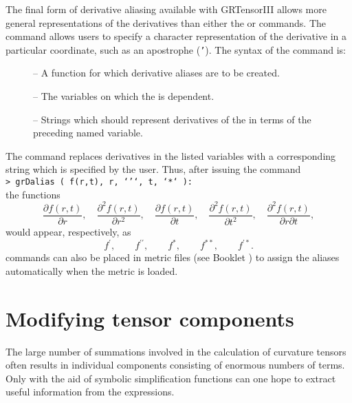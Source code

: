 \documentclass{article}
\begin{document}
{{{The final form of derivative aliasing available with GRTensorIII allows more
general representations of the derivatives than either the 
 or  commands. The 
command allows users to specify a character representation of the derivative
in a particular coordinate, such as an apostrophe (\texttt{'}). The syntax
of the command is:\\
%
\begin{cmdspec}
  \label{spec:grDalias}

  \begin{description}
    \item[] -- A function for which derivative aliases are
      to be created.
    \item[] -- The variables on which the 
      is dependent.
    \item[] -- Strings which should represent derivatives of
      the  in terms of the preceding named variable.
  \end{description}

\end{cmdspec}

The  command replaces derivatives in the listed variables
with a corresponding string which is specified by the user. Thus, after
issuing the command\\

\noindent\texttt{> grDalias ( f(r,t), r, `'`, t, `*` ):}\\

\noindent the functions
\[
  \frac{\partial f(r,t)}{\partial r}, \quad 
  \frac{\partial^2 f(r,t)}{\partial r^2}, \quad
  \frac{\partial f(r,t)}{\partial t}, \quad
  \frac{\partial^2 f(r,t)}{\partial t^2}, \quad
  \frac{\partial^2 f(r,t)}{\partial r \partial t},
\]
would appear, respectively, as
\[
  f^\prime, \qquad f^{\prime\prime}, \qquad f^*, \qquad f^{**}, \qquad
    f^{\prime *}.
\]
 commands can also be placed in metric files (see
Booklet \grMakegRef) to assign the aliases automatically when the
metric is loaded.
%
\section{Modifying tensor components} \label{sec:gralter}
%
The large number of summations involved in the calculation of
curvature tensors often results in individual components consisting of
enormous numbers of terms. Only with the aid of symbolic
simplification functions can one hope to extract useful information
from the expressions.

}}}
\end{document}

